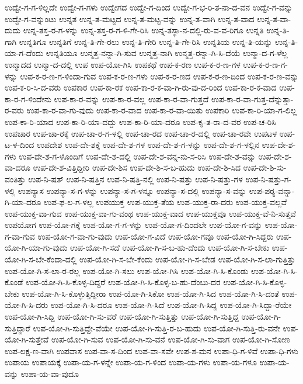 {ಉದ್ವೇ-ಗ-ಗ-ಳಿಲ್ಲದೇ
ಉದ್ವೇ-ಗ-ಗಳು
ಉದ್ವೇಗದ
ಉದ್ವೇ-ಗ-ದಿಂದ
ಉದ್ವೇ-ಗ-ಭ-ರಿ-ತ-ನಾ-ದ-ವನ
ಉದ್ವೇ-ಗ-ವನ್ನು
ಉದ್ವೇ-ಗ-ವನ್ನುಂಟು
ಉನ್ನತ
ಉನ್ನ-ತ-ಮಟ್ಟದ
ಉನ್ನ-ತ-ಮಟ್ಟ-ವನ್ನು
ಉನ್ನ-ತ-ವಾಗಿ
ಉನ್ನ-ತ-ವಾದ
ಉನ್ನ-ತ-ವಾ-ದುದು
ಉನ್ನ-ತಸ್ತ-ರ-ಗ-ಳನ್ನು
ಉನ್ನ-ತಸ್ತ-ರ-ಗ-ಳಿ-ಗೇ-ರಿಸಿ
ಉನ್ನ-ತಸ್ಥಾ-ನ-ದಲ್ಲಿ-ರು-ವ-ವ-ರಿಗೂ
ಉನ್ನತಿ
ಉನ್ನ-ತಿ-ಗಾಗಿ
ಉನ್ನತಿಗೂ
ಉನ್ನತಿಗೆ
ಉನ್ನ-ತಿ-ಗೇ-ರಲು
ಉನ್ನ-ತಿ-ಗೇರಿ
ಉನ್ನ-ತಿ-ಗೇ-ರಿಸಿ
ಉನ್ನತಿಯ
ಉನ್ನ-ತಿ-ಯನ್ನು
ಉನ್ನ-ತಿ-ಯಾ-ಗ-ದೆಂದು
ಉನ್ನತಿಯೂ
ಉನ್ಮತ್ತ-ನನ್ನಾ-ಗಿ-ಸುವ
ಉನ್ಮತ್ತ-ನಾಗಿ
ಉನ್ಮತ್ತ-ರನ್ನಾ-ಗಿ-ಸಿ-ದೆಯೆ
ಉನ್ಮಾ-ದ-ಗ-ಳೆಲ್ಲ
ಉನ್ಮಾದದ
ಉನ್ಮಾ-ದ-ದಲ್ಲಿ
ಉಪ
ಉಪ-ಯೋ-ಗಿಸಿ
ಉಪಕಥೆ
ಉಪ-ಕ-ರಣ
ಉಪ-ಕ-ರ-ಣ-ಗಳ
ಉಪ-ಕ-ರ-ಣ-ಗ-ಳನ್ನು
ಉಪ-ಕ-ರ-ಣ-ಗ-ಳಿಂದಾ-ಗುವ
ಉಪ-ಕ-ರ-ಣ-ಗಳು
ಉಪ-ಕ-ರ-ಣದ
ಉಪ-ಕ-ರ-ಣ-ದಿಂದ
ಉಪ-ಕ-ರ-ಣ-ವನ್ನು
ಉಪ-ಕ-ರಿ-ಸಿ-ದ-ವರು
ಉಪಕಾರ
ಉಪ-ಕಾ-ರಕ
ಉಪ-ಕಾ-ರ-ಕ-ವಾ-ಗಿ-ರು-ವು-ದ-ರಿಂದ
ಉಪ-ಕಾ-ರ-ಕ-ವಾದ
ಉಪ-ಕಾ-ರ-ಗ-ಳಿಂದೇನು
ಉಪ-ಕಾ-ರ-ವನ್ನು
ಉಪ-ಕಾ-ರ-ವಲ್ಲ
ಉಪ-ಕಾ-ರ-ವಾ-ಗುತ್ತದೆ
ಉಪ-ಕಾ-ರ-ವಾ-ಗುತ್ತ-ದೆನ್ನುತ್ತಾ-ರ-ವರು
ಉಪ-ಕಾ-ರ-ವಾ-ಗು-ವುದು
ಉಪ-ಕಾ-ರ-ವಾದ
ಉಪ-ಕಾ-ರ-ವಾ-ಯಿತು
ಉಪಕಾರಿ
ಉಪ-ಕಾ-ರಿ-ಯಾ-ಗ-ಲಿಲ್ಲ
ಉಪ-ಕಾ-ರಿ-ಯಾದ
ಉಪ-ಕಾ-ರಿ-ಯಾ-ದದ್ದು
ಉಪ-ಕಾ-ರಿ-ಯಾ-ದರೂ
ಉಪ-ಕೃ-ತ-ರಾ-ದ-ವರ
ಉಪ-ಚ-ರಿಸಿ
ಉಪಚಾರ
ಉಪ-ಚಾ-ರಕ್ಕೆ
ಉಪ-ಚಾ-ರ-ಗ-ಳಲ್ಲಿ
ಉಪ-ಚಾ-ರದ
ಉಪ-ಚಾ-ರ-ದಲ್ಲಿ
ಉಪ-ಚಾ-ರವೇ
ಉಪಟಳ
ಉಪ-ಟ-ಳ-ದಿಂದ
ಉಪದೇಶ
ಉಪ-ದೇ-ಶಕ್ಕೆ
ಉಪ-ದೇ-ಶ-ಗಳ
ಉಪ-ದೇ-ಶ-ಗ-ಳನ್ನು
ಉಪ-ದೇ-ಶ-ಗ-ಳಲ್ಲಿನ
ಉಪ-ದೇ-ಶ-ಗಳು
ಉಪ-ದೇ-ಶ-ಗ-ಳೊಂದಿಗೆ
ಉಪ-ದೇ-ಶ-ದಲ್ಲಿ
ಉಪ-ದೇ-ಶ-ವನ್ನ-ನು-ಸ-ರಿಸಿ
ಉಪ-ದೇ-ಶ-ವನ್ನು
ಉಪ-ದೇ-ಶ-ವಾ-ದರೂ
ಉಪ-ದೇ-ಶ-ವಿತ್ತಿದ್ದೀರಿ
ಉಪ-ದೇ-ಶಿಸ
ಉಪ-ದೇ-ಶಿ-ಸ-ಬ-ಹುದು
ಉಪ-ದೇ-ಶಿ-ಸಿದ
ಉಪ-ದೇ-ಶಿ-ಸು-ವಂತಿತ್ತು
ಉಪ-ನಿ-ಷತ್
ಉಪ-ನಿ-ಷತ್ತಿನ
ಉಪ-ನಿ-ಷತ್ತಿ-ನಲ್ಲಿ
ಉಪ-ನಿ-ಷತ್ತು
ಉಪ-ನಿ-ಷತ್ತು-ಗಳ
ಉಪ-ನಿ-ಷತ್ತು-ಗ-ಳಲ್ಲಿ
ಉಪನ್ಯಾಸ
ಉಪನ್ಯಾ-ಸ-ಗ-ಳನ್ನು
ಉಪನ್ಯಾ-ಸ-ಗ-ಳನ್ನೂ
ಉಪನ್ಯಾ-ಸ-ದಲ್ಲಿ
ಉಪನ್ಯಾ-ಸ-ವನ್ನು
ಉಪ-ಪಠ್ಯ-ವನ್ನಾ-ಗಿ-ಯಾ-ದರೂ
ಉಪ-ಫ-ಲ-ಗ-ಳಲ್ಲ
ಉಪಯುಕ್ತ
ಉಪ-ಯುಕ್ತ-ತೆಯ
ಉಪ-ಯುಕ್ತ-ರಾ-ದರು
ಉಪ-ಯುಕ್ತ-ವಲ್ಲವೆ
ಉಪ-ಯುಕ್ತ-ವಾ-ಗುವ
ಉಪ-ಯುಕ್ತ-ವಾ-ಗು-ವಂಥ
ಉಪ-ಯುಕ್ತ-ವಾದ
ಉಪ-ಯುಕ್ತವೂ
ಉಪ-ಯುಕ್ತ-ವೆ-ನಿ-ಸುತ್ತವೆ
ಉಪಯೋಗ
ಉಪ-ಯೋ-ಗಕ್ಕೆ
ಉಪ-ಯೋ-ಗ-ಗ-ಳನ್ನು
ಉಪ-ಯೋ-ಗ-ದಿಂದಲೇ
ಉಪ-ಯೋ-ಗ-ವನ್ನು
ಉಪ-ಯೋ-ಗ-ವಾ-ಗುವ
ಉಪ-ಯೋ-ಗ-ವಾ-ಗು-ವುದು
ಉಪ-ಯೋ-ಗ-ವಿದೆ
ಉಪ-ಯೋ-ಗವೂ
ಉಪ-ಯೋ-ಗಿ-ಸಿದ್ದರು
ಉಪ-ಯೋ-ಗಿ-ಯಾ-ಗು-ವುದು
ಉಪ-ಯೋ-ಗಿ-ಸದೆ
ಉಪ-ಯೋ-ಗಿ-ಸ-ಬ-ಹು-ದೆಂದು
ಉಪ-ಯೋ-ಗಿ-ಸ-ಬೇಕು
ಉಪ-ಯೋ-ಗಿ-ಸ-ಬೇ-ಕೆಂದಾ-ದಲ್ಲಿ
ಉಪ-ಯೋ-ಗಿ-ಸ-ಬೇ-ಕೆಂದು
ಉಪ-ಯೋ-ಗಿ-ಸ-ಬೇಡ
ಉಪ-ಯೋ-ಗಿ-ಸ-ಲಾ-ಗುತ್ತಿತ್ತು
ಉಪ-ಯೋ-ಗಿ-ಸ-ಲಾ-ರ-ರಲ್ಲ
ಉಪ-ಯೋ-ಗಿ-ಸಲು
ಉಪ-ಯೋ-ಗಿಸಿ
ಉಪ-ಯೋ-ಗಿ-ಸಿ-ಕೊಂಡು
ಉಪ-ಯೋ-ಗಿ-ಸಿ-ಕೊಂಡೆ
ಉಪ-ಯೋ-ಗಿ-ಸಿ-ಕೊಳ್ಳ-ದಿದ್ದರೆ
ಉಪ-ಯೋ-ಗಿ-ಸಿ-ಕೊಳ್ಳ-ಬ-ಹು-ದೆಂಬು-ದರ
ಉಪ-ಯೋ-ಗಿ-ಸಿ-ಕೊಳ್ಳ-ಬೇಕು
ಉಪ-ಯೋ-ಗಿ-ಸಿ-ಕೊಳ್ಳುತ್ತಿದ್ದೀರಾ
ಉಪ-ಯೋ-ಗಿ-ಸಿಕೋ
ಉಪ-ಯೋ-ಗಿ-ಸಿದ
ಉಪ-ಯೋ-ಗಿ-ಸಿ-ದಂತೆ
ಉಪ-ಯೋ-ಗಿ-ಸಿ-ದರು
ಉಪ-ಯೋ-ಗಿ-ಸಿ-ದರೂ
ಉಪ-ಯೋ-ಗಿ-ಸಿದೆ
ಉಪ-ಯೋ-ಗಿ-ಸಿದ್ದ
ಉಪ-ಯೋ-ಗಿ-ಸಿದ್ದಾ-ರೆಯೇ
ಉಪ-ಯೋ-ಗಿ-ಸಿದ್ದಿ
ಉಪ-ಯೋ-ಗಿ-ಸು-ವರೆ
ಉಪ-ಯೋ-ಗಿ-ಸುತ್ತಿತ್ತು
ಉಪ-ಯೋ-ಗಿ-ಸುತ್ತಿದ್ದ
ಉಪ-ಯೋ-ಗಿ-ಸುತ್ತಿದ್ದಾರೆ
ಉಪ-ಯೋ-ಗಿ-ಸುತ್ತಿದ್ದೇ-ವೆಯೇ
ಉಪ-ಯೋ-ಗಿ-ಸುತ್ತಿ-ರ-ಬ-ಹುದು
ಉಪ-ಯೋ-ಗಿ-ಸುತ್ತಿ-ರು-ವನೇ
ಉಪ-ಯೋ-ಗಿ-ಸುತ್ತೇವೆ
ಉಪ-ಯೋ-ಗಿ-ಸುವ
ಉಪ-ಯೋ-ಗಿ-ಸು-ವನೆ
ಉಪ-ಯೋ-ಗಿ-ಸು-ವಾಗ
ಉಪ-ಯೋ-ಗಿ-ಸೋಣ
ಉಪ-ಲಕ್ಷ-ಣ-ವಾಗಿ
ಉಪವಾಸ
ಉಪ-ವಾ-ಸ-ದಿಂದ
ಉಪ-ವಾ-ಸವೇ
ಉಪ-ಶ-ಮನ
ಉಪಾ-ಧಿ-ಗ-ಳಿವೆ
ಉಪಾ-ಧಿ-ಗಳು
ಉಪಾಯ
ಉಪಾಯಕ್ಕೆ
ಉಪಾ-ಯ-ಗ-ಳನ್ನೇ
ಉಪಾ-ಯ-ಗ-ಳಿಂದ
ಉಪಾ-ಯ-ಗಳು
ಉಪಾ-ಯ-ಗಳೂ
ಉಪಾ-ಯ-ವನ್ನು
ಉಪಾ-ಯ-ವಾ-ವುದೂ
}

